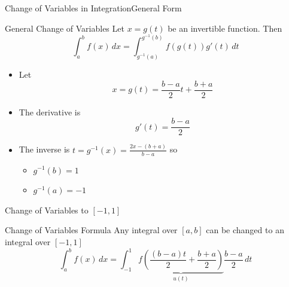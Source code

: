 \documentclass[10pt]{beamer}
\begin{document}
\begin{frame}{Change of Variables in Integration}{General Form}
\begin{block}{General Change of Variables}
    Let $x = g(t)$ be an invertible function. Then 
        $$\int_a^b f(x)\,dx = \int_{g^{-1}(a)}^{g^{-1}(b)} f(g(t)) g'(t)\, dt$$
\end{block}

\begin{itemize}
    \item Let $$ x = g(t)  = \frac{b-a}{2}t+\frac{b+a}{2}$$  
    \item The derivative is 
    $$g'(t) = \frac{b-a}{2}$$
    \item The inverse is  $t = g^{-1}(x) = \frac{2x - (b+a)}{b-a}$ so 
    \begin{itemize}
        \item $g^{-1}(b) = 1$
        \item $g^{-1}(a) = -1$
    \end{itemize}
    
\end{itemize}
\end{frame}


\begin{frame}{Change of Variables to $[-1,1]$}

\begin{block}{Change of Variables Formula}
Any integral over $[a,b]$ can be changed to an integral over $[-1,1]$ 
\begin{equation*}
    \int_a^b f(x)\,dx = \int_{-1}^{1}
    \underbrace{f\left(\frac{(b-a)t}{2}+\frac{b+a}{2}\right)}_{u(t)}\frac{b-a}{2}\,dt
\end{equation*}
\end{block}



\end{frame}

\end{document}
